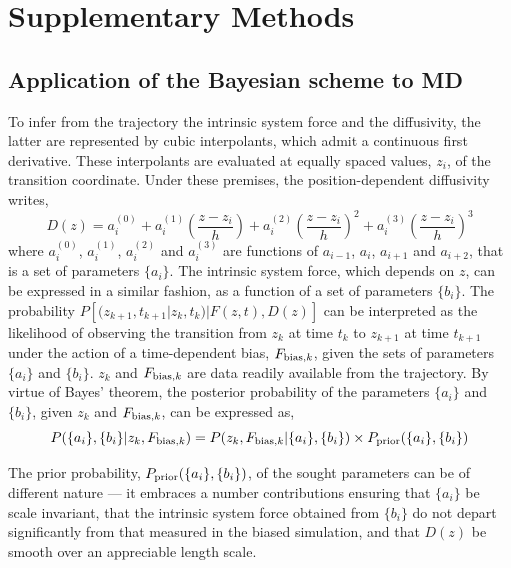 \section*{Supplementary Methods}
\subsection*{Application of the Bayesian scheme to MD}
  \par To infer from the trajectory the intrinsic system force and the diffusivity, the latter are represented by cubic interpolants, which admit a continuous first derivative. These interpolants are evaluated at equally spaced values, $z_i$, of the transition coordinate. Under these premises, the position-dependent diffusivity writes,
%
\begin{equation}
D(z) = a_i^{(0)} + a_i^{(1)} \left(\frac{z-z_i}{h}\right) + a_i^{(2)} \left(\frac{z-z_i}{h}\right)^2 + a_i^{(3)} \left(\frac{z-z_i}{h}\right)^3
\end{equation}
%
  where $a_i^{(0)}$, $a_i^{(1)}$, $a_i^{(2)}$ and $a_i^{(3)}$ are functions of $a_{i-1}$, $a_i$, $a_{i+1}$ and $a_{i+2}$, that is a set of parameters $\{ a_i \}$. The intrinsic system force, which depends on $z$, can be expressed in a similar fashion, as a function of a set of parameters $\{ b_i \}$. The probability $P[(z_{k+1}, t_{k+1} | z_k, t_k) | F(z,t), D(z)]$ can be interpreted as the likelihood of observing the transition from $z_k$ at time $t_k$ to $z_{k+1}$ at time $t_{k+1}$ under the action of a time-dependent bias, $F_{{\rm bias}, k}$, given the sets of parameters $\{ a_i \}$ and $\{ b_i \}$. $z_k$ and $F_{{\rm bias}, k}$ are data readily available from the trajectory. By virtue of Bayes' theorem, the posterior probability of the parameters $\{ a_i \}$ and $\{ b_i \}$, given $z_k$ and $F_{{\rm bias}, k}$, can be expressed as,
%
\begin{equation}
\label{Bayes}
P(\{ a_i \}, \{ b_i \} | z_k, F_{{\rm bias}, k}) =
P(z_k, F_{{\rm bias}, k} | \{ a_i \}, \{ b_i \}) \times P_{\rm prior}(\{ a_i \}, \{ b_i \})
\end{equation}
%
  \par The prior probability, $P_{\rm prior}(\{ a_i \}, \{ b_i \})$, of the sought parameters can be of different nature --- it embraces a number contributions ensuring that $\{ a_i \}$ be scale invariant, that the intrinsic system force obtained from $\{ b_i \}$ do not depart significantly from that measured in the biased simulation, and that $D(z)$ be smooth over an appreciable length scale.


